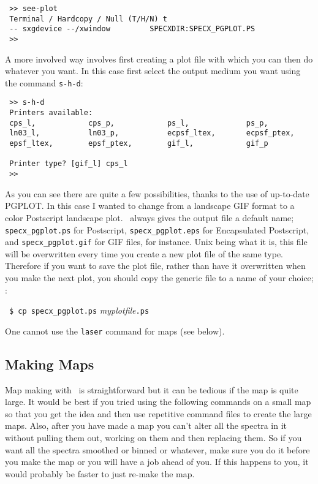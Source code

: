 \begin{verbatim}
 >> see-plot
 Terminal / Hardcopy / Null (T/H/N) t
 -- sxgdevice --/xwindow         SPECXDIR:SPECX_PGPLOT.PS
 >> 
\end{verbatim}

A more involved way involves first creating a plot file with which you
can then do whatever you want. In this case first select the output
medium you want using the command {\tt s-h-d}:

\begin{verbatim}
 >> s-h-d
 Printers available: 
 cps_l,            cps_p,            ps_l,             ps_p,             
 ln03_l,           ln03_p,           ecpsf_ltex,       ecpsf_ptex,       
 epsf_ltex,        epsf_ptex,        gif_l,            gif_p             
 
 Printer type? [gif_l] cps_l
 >> 
\end{verbatim}

As you can see there are quite a few possibilities, thanks to the use
of up-to-date PGPLOT. In this case I wanted to change from a landscape
GIF format to a color Postscript landscape plot. \SPECX\ always gives
the output file a default name; \verb|specx_pgplot.ps| for Postscript,
\verb|specx_pgplot.eps| for Encapsulated Postscript, 
and \verb|specx_pgplot.gif| for GIF files, for instance. Unix being
what it is, this file will be overwritten every time you create a new
plot file of the same type.  Therefore if you want to save the plot
file, rather than have it overwritten when you make the next plot, you
should copy the generic file to a name of your choice; \eg :

\SP\ \verb|$ cp specx_pgplot.ps| {\it myplotfile}{\tt .ps}


One cannot use the {\tt laser} command for maps (see below). 

\subsection{Making Maps}
\label{sec:specx_13}
Map making with \SPECX\ is straightforward but it can be tedious if
the map is quite large.  It would be best if you tried using the
following commands on a small map so that you get the idea and then
use repetitive command files to create the large maps.  Also, after
you have made a map you can't alter all the spectra in it without
pulling them out, working on them and then replacing them.  So if you
want all the spectra smoothed or binned or whatever, make sure you do
it before you make the map or you will have a job ahead of you. If
this happens to you, it would probably be faster to just re-make the
map.

